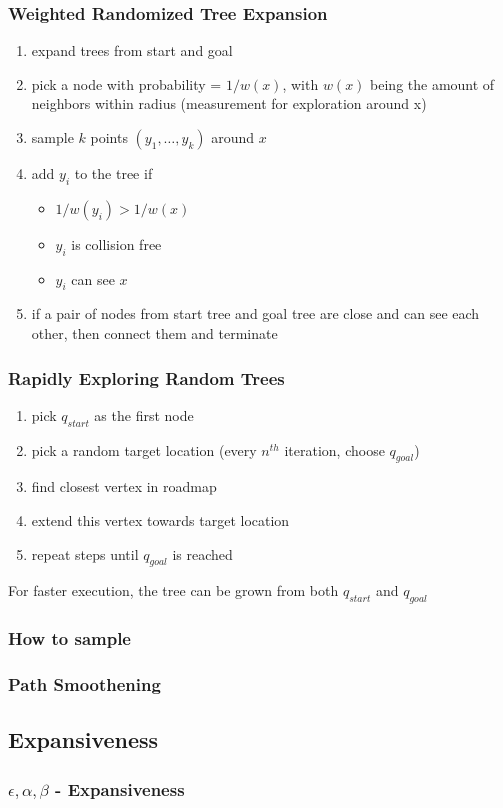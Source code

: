 \documentclass{beamer}
\begin{document}
  \begin{frame}
    \frametitle{Weighted Randomized Tree Expansion}
    \begin{enumerate}
      \item expand trees from start and goal
      \item pick a node with probability = $1/w(x)$, with $w(x)$ being the amount of neighbors within radius (measurement for exploration around x)
      \item sample $k$ points $(y_{1}, \dots, y_{k})$ around $x$
      \item add $y_{i}$ to the tree if
        \begin{itemize}
        \item $1/w(y_{i}) > 1/w(x)$
        \item $y_{i}$ is collision free
        \item $y_{i}$ can see $x$
        \end{itemize}
      \item if a pair of nodes from start tree and goal tree are close and can see each other, then connect them and terminate
    \end{enumerate}  
  
  \end{frame}

  \begin{frame}
    \frametitle{Rapidly Exploring Random Trees}
    \begin{enumerate}
      \item pick $q_{start}$ as the first node
      \item pick a random target location (every $n^{th}$ iteration, choose $q_{goal}$)
      \item find closest vertex in roadmap
      \item extend this vertex towards target location
      \item repeat steps until $q_{goal}$ is reached
    \end{enumerate}

    For faster execution, the tree can be grown from both $q_{start}$ and $q_{goal}$
  
  \end{frame}

  \begin{frame}
    \frametitle{How to sample}
  
  \end{frame}

  \begin{frame}
    \frametitle{Path Smoothening}
  \end{frame}

  \subsection{Expansiveness}

  \begin{frame}
    \frametitle{$\epsilon, \alpha, \beta$ - Expansiveness}
  
  \end{frame}
\end{document}
